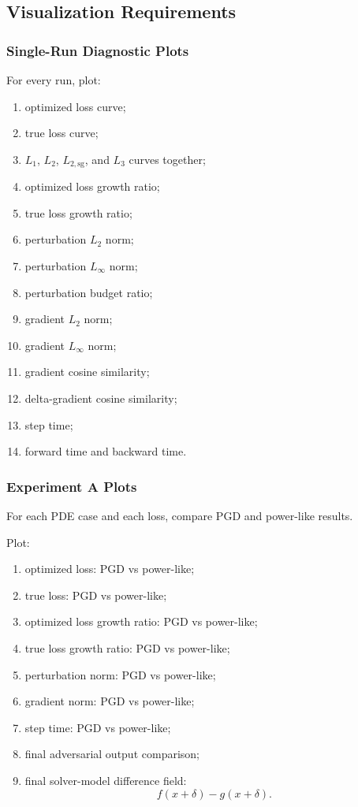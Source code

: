 \documentclass{article}
\begin{document}
\subsection{Visualization Requirements}

\subsubsection{Single-Run Diagnostic Plots}

For every run, plot:

\begin{enumerate}
    \item optimized loss curve;
    \item true loss curve;
    \item \(L_1\), \(L_2\), \(L_{2,\mathrm{sg}}\), and \(L_3\) curves together;
    \item optimized loss growth ratio;
    \item true loss growth ratio;
    \item perturbation \(L_2\) norm;
    \item perturbation \(L_\infty\) norm;
    \item perturbation budget ratio;
    \item gradient \(L_2\) norm;
    \item gradient \(L_\infty\) norm;
    \item gradient cosine similarity;
    \item delta-gradient cosine similarity;
    \item step time;
    \item forward time and backward time.
\end{enumerate}

\subsubsection{Experiment A Plots}

For each PDE case and each loss, compare PGD and power-like results.

Plot:

\begin{enumerate}
    \item optimized loss: PGD vs power-like;
    \item true loss: PGD vs power-like;
    \item optimized loss growth ratio: PGD vs power-like;
    \item true loss growth ratio: PGD vs power-like;
    \item perturbation norm: PGD vs power-like;
    \item gradient norm: PGD vs power-like;
    \item step time: PGD vs power-like;
    \item final adversarial output comparison;
    \item final solver-model difference field:
    \[
    f(x+\delta)-g(x+\delta).
    \]
\end{enumerate}
\end{document}
